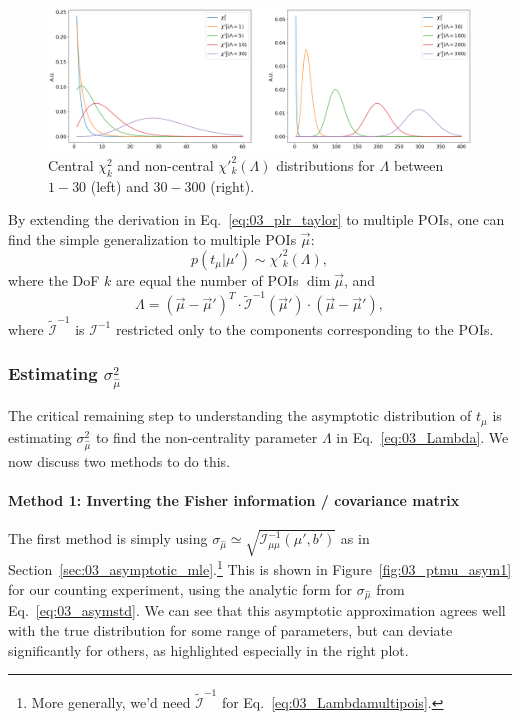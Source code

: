 \begin{figure}[htb]
  \centering
  \includegraphics[width=\textwidth]{figures/03-Stats/06-asymptotic-plr/1.png}
  \caption{Central $\chi^2_k$ and non-central $\chi'^2_k(\Lambda)$ distributions for $\Lambda$ between $1-30$ (left) and $30-300$ (right).}
  \label{fig:03_noncentralchi2}
\end{figure}

By extending the derivation in Eq.~\ref{eq:03_plr_taylor} to multiple POIs, one can find the simple generalization to multiple POIs $\vec\mu$:
\begin{equation}
p(t_\mu|\mu') \sim \chi'^2_k(\Lambda),
\label{eq:03_chi2multipois}
\end{equation}
where the DoF $k$ are equal the number of POIs $\dim\vec\mu$, and 
\begin{equation}
\Lambda = (\vec\mu - \vec\mu')^T \cdot \tilde{\mathcal I}^{-1}(\vec\mu') \cdot (\vec\mu - \vec\mu'),
\label{eq:03_Lambdamultipois}
\end{equation}
where $\tilde{\mathcal I}^{-1}$ is $\mathcal I^{-1}$ restricted only to the components corresponding to the POIs.


\subsubsection{Estimating \texorpdfstring{$\sigma_{\hat\mu}^2$}{σ2}}

The critical remaining step to understanding the asymptotic distribution of $t_\mu$ is estimating $\sigma_{\hat\mu}^2$ to find the non-centrality parameter $\Lambda$ in Eq.~\ref{eq:03_Lambda}.
We now discuss two methods to do this.

\paragraph{Method 1: Inverting the Fisher information / covariance matrix}

The first method is simply using $\sigma_{\hat\mu} \simeq \sqrt{\mathcal I^{-1}_{\mu\mu}(\mu', b')}$ as in Section~\ref{sec:03_asymptotic_mle}.\footnote{More generally, we'd need $\tilde{\mathcal I}^{-1}$ for Eq.~\ref{eq:03_Lambdamultipois}.}
This is shown in Figure~\ref{fig:03_ptmu_asym1} for our counting experiment, using the analytic form for $\sigma_{\hat\mu}$ from Eq.~\ref{eq:03_asymstd}.
We can see that this asymptotic approximation agrees well with the true distribution for some range of parameters, but can deviate significantly for others, as highlighted especially in the right plot.


